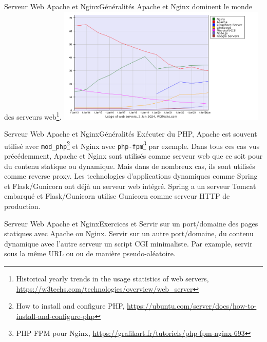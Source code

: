 \documentclass{beamer}
\begin{document}
    \begin{frame}{Serveur Web Apache et Nginx}{Généralités}
        Apache et Nginx dominent le monde des serveurs web\footnote{Historical yearly trends in the usage statistics of web servers, \url{https://w3techs.com/technologies/overview/web_server}}.
        \bigbreak
        \centering
        \includegraphics[width=10cm]{image/web-server-stats}
    \end{frame}

    \begin{frame}{Serveur Web Apache et Nginx}{Généralités}
        Exécuter du PHP, Apache est souvent utilisé avec \lstinline{mod_php}\footnote{How to install and configure PHP, \url{https://ubuntu.com/server/docs/how-to-install-and-configure-php}} et Nginx avec \lstinline{php-fpm}\footnote{PHP FPM pour Nginx, \url{https://grafikart.fr/tutoriels/php-fpm-nginx-693}} par exemple.
        \bigbreak
        Dans tous ces cas vus précédemment, Apache et Nginx sont utilisés comme serveur web que ce soit pour du contenu statique ou dynamique.
        \bigbreak
        Mais dans de nombreux cas, ils sont utilisés comme reverse proxy.
        Les technologies d'applications dynamiques comme Spring et Flask/Gunicorn ont déjà un serveur web intégré.
        Spring a un serveur Tomcat embarqué et Flask/Gunicorn utilise Gunicorn comme serveur HTTP de production.
    \end{frame}

    \begin{frame}{Serveur Web Apache et Nginx}{Exercices \execcounterdispinc{} et \execcounterdispinc{}}
        Servir sur un port/domaine des pages statiques avec Apache ou Nginx.
        \bigbreak
        Servir sur un autre port/domaine, du contenu dynamique avec l'autre serveur un script CGI minimaliste.
        Par example, servir sous la même URL  ou  ou  de manière pseudo-aléatoire.
    \end{frame}
\end{document}
